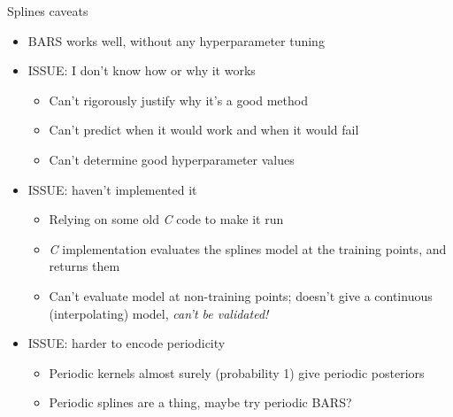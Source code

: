 \documentclass[presentation]{beamer}
\begin{document}
\begin{frame}[label={sec:orgc729b39}]{Splines caveats}
\begin{itemize}[<+->]
\item BARS works well, without any hyperparameter tuning
\item ISSUE: I don't know how or why it works
\begin{itemize}
\item Can't rigorously justify why it's a good method
\item Can't predict when it would work and when it would fail
\item Can't determine good hyperparameter values
\end{itemize}
\item ISSUE: haven't implemented it
\begin{itemize}
\item Relying on some old \emph{C} code to make it run
\item \emph{C} implementation evaluates the splines model at the training points, and returns them
\item Can't evaluate model at non-training points; doesn't give a continuous (interpolating) model, \emph{can't be validated!}
\end{itemize}
\item ISSUE: harder to encode periodicity
\begin{itemize}
\item Periodic kernels almost surely (probability 1) give periodic posteriors
\item Periodic splines are a thing, maybe try periodic BARS?
\end{itemize}
\end{itemize}
\end{frame}
\end{document}
